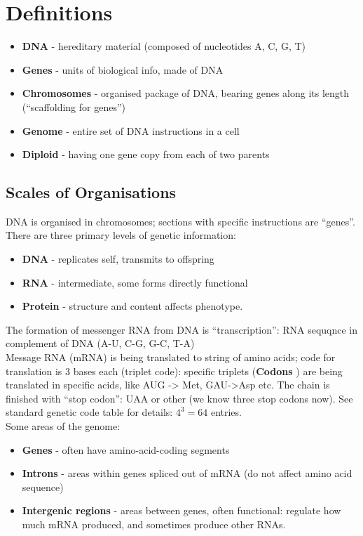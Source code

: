 \documentclass{scrartcl}
\begin{document}
\tableofcontents
\section {Definitions}
\label{sec:2-1}
\begin{itemize}
\item {\bf DNA } - hereditary material (composed of nucleotides A, C, G, T)
\item {\bf Genes } - units of biological info, made of DNA
\item {\bf Chromosomes } - organised package of DNA, bearing genes along its
  length (``scaffolding for genes'')
\item {\bf Genome } - entire set of DNA instructions in a cell
\item {\bf Diploid } - having one gene copy from each of two parents
\end{itemize}
\subsection{Scales of Organisations}
\label{sec:2-3}
DNA is organised in chromosomes; sections with specific instructions are
``genes''. There are three primary levels of genetic information:
\begin{itemize}
\item {\bf DNA } - replicates self, transmits to offspring
\item {\bf RNA } - intermediate, some forms directly functional
\item {\bf Protein } - structure and content affects phenotype.
\end{itemize}
The formation of messenger RNA from DNA is ``transcription'': RNA sequqnce in
complement of DNA (A-U, C-G, G-C, T-A)\\
Message RNA (mRNA) is being translated to string of amino acids; code for
translation is 3 bases each (triplet code): specific triplets ({\bf Codons })
are being translated in specific acids, like AUG -> Met, GAU->Asp etc. The chain
is finished with ``stop codon'': UAA or other (we know three stop codons now).
See standard genetic code table for details: $4^3 = 64$ entries.\\
Some areas of the genome:
\begin{itemize}
\item {\bf Genes } - often have amino-acid-coding segments
\item {\bf Introns } - areas within genes spliced out of mRNA (do not affect
  amino acid sequence)
\item {\bf Intergenic regions } - areas between genes, often functional:
  regulate how much mRNA produced, and sometimes produce other RNAs.
\end{itemize}
\end{document}
